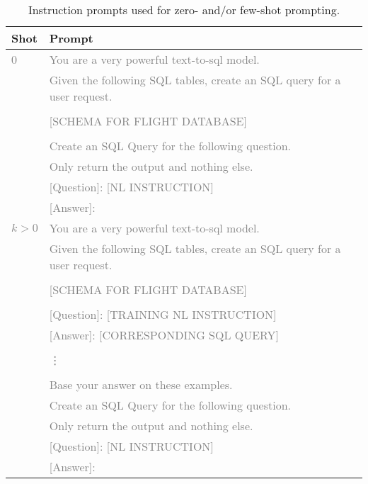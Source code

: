 \documentclass{article}
\begin{document}
\begin{table}[h!]
\centering
\begin{tabular}{p{1cm}p{12cm}}
\toprule
\textbf{Shot} & \textbf{Prompt} \\
\midrule
    \textcolor{gray}{0} & \textcolor{gray}{You are a very powerful text-to-sql model.} \\
    & \textcolor{gray}{Given the following SQL tables, create an SQL query for a user request.} \\
	& \textcolor{gray}{} \\
	& \textcolor{gray}{[SCHEMA FOR FLIGHT DATABASE]} \\
	& \textcolor{gray}{} \\
	& \textcolor{gray}{Create an SQL Query for the following question.} \\
	& \textcolor{gray}{Only return the output and nothing else.} \\
	& \textcolor{gray}{[Question]: [NL INSTRUCTION]} \\
	& \textcolor{gray}{[Answer]: } \\
\midrule
	\textcolor{gray}{$k > 0$} & \textcolor{gray}{You are a very powerful text-to-sql model. }\\
	& \textcolor{gray}{Given the following SQL tables, create an SQL query for a user request.} \\
	& \textcolor{gray}{} \\
	& \textcolor{gray}{[SCHEMA FOR FLIGHT DATABASE]} \\
	& \textcolor{gray}{} \\
	& \textcolor{gray}{[Question]: [TRAINING NL INSTRUCTION] }\\
	& \textcolor{gray}{[Answer]: [CORRESPONDING SQL QUERY]} \\
	& \\
	& \textcolor{gray}{\vdots} \\
	& \\
	& \textcolor{gray}{Base your answer on these examples.} \\
	& \textcolor{gray}{Create an SQL Query for the following question.} \\
	& \textcolor{gray}{Only return the output and nothing else.} \\
	& \textcolor{gray}{[Question]: [NL INSTRUCTION]} \\
	& \textcolor{gray}{[Answer]: } \\
\bottomrule
\end{tabular}
\caption{Instruction prompts used for zero- and/or few-shot prompting.}
\label{tab:icl_prompts}
\end{table}
\end{document}
